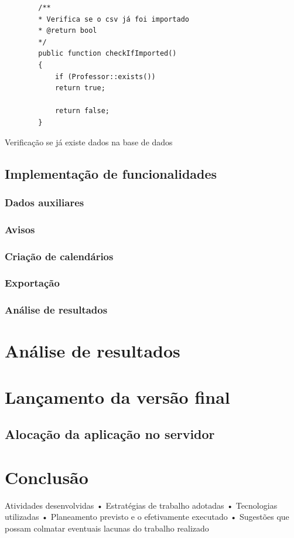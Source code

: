 \documentclass[12pt, twoside]{report}
\begin{document}
	\begin{listing}[H]
		\begin{verbatim}
		/**
		* Verifica se o csv já foi importado
		* @return bool
		*/
		public function checkIfImported()
		{
			if (Professor::exists())
			return true;
			
			return false;
		}
		\end{verbatim}
		\caption{Verificação se já existe dados na base de dados}
		\label{checkIfImported}
	\end{listing}
	
		
	\section{Implementação de funcionalidades}
	\subsection{Dados auxiliares}
	\subsection{Avisos}
	\subsection{Criação de calendários}
	\subsection{Exportação}
	
	\subsection{Análise de resultados}
	
	
	
	\chapter{Análise de resultados}
	
	
	
	
	\chapter{Lançamento da versão final}
	
	\section{Alocação da aplicação no servidor}
	
	
	
	\chapter{Conclusão}
	
	Atividades desenvolvidas
	• Estratégias de trabalho adotadas
	• Tecnologias utilizadas
	• Planeamento previsto e o efetivamente executado
	• Sugestões que possam colmatar eventuais lacunas do
	trabalho realizado
	
	
	
	\pagestyle{empty}
	
	
\end{document}
